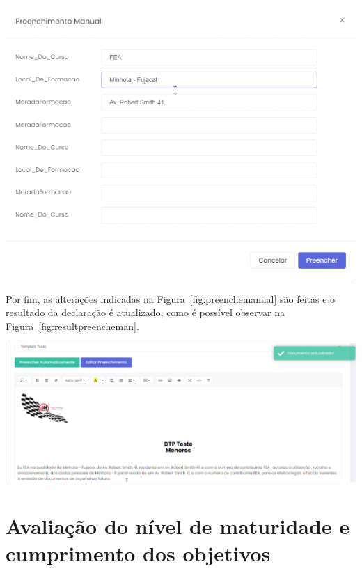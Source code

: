 \begin{center}
        \includegraphics[width=\textwidth,height=\textheight,keepaspectratio]{images/preenchemanual.png}
        \label{fig:preenchemanual}
\end{center}

Por fim, as alterações indicadas na Figura~\ref{fig:preenchemanual} são feitas e o resultado da declaração é atualizado, como é possível observar na Figura~\ref{fig:resultpreencheman}.

\begin{center}
        \includegraphics[width=\textwidth,height=\textheight,keepaspectratio]{images/resultpreencheman.png}
        \label{fig:resultpreencheman}
\end{center}

\section{Avaliação do nível de maturidade e cumprimento dos objetivos}

